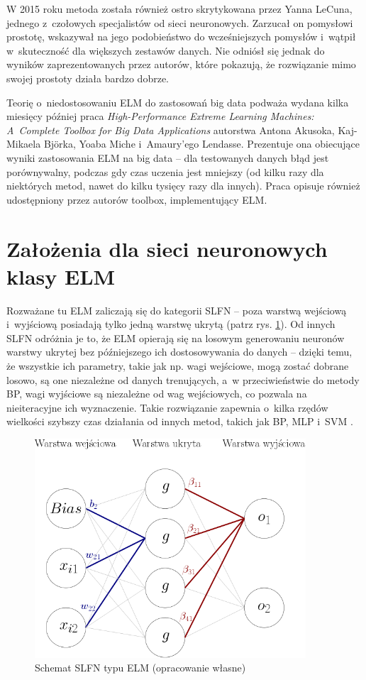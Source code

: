 \documentclass[pl]{minipw} %
\begin{document}
W 2015 roku metoda została również ostro skrytykowana przez Yanna LeCuna, jednego z~czołowych specjalistów od sieci neuronowych. Zarzucał on pomysłowi prostotę, wskazywał na jego podobieństwo do wcześniejszych pomysłów i~wątpił w~skuteczność dla większych zestawów danych. Nie odniósł się jednak do wyników zaprezentowanych przez autorów, które pokazują, że rozwiązanie mimo swojej prostoty działa bardzo dobrze.

Teorię o~niedostosowaniu ELM do zastosowań big data podważa wydana kilka miesięcy później praca \textit{High-Performance Extreme Learning Machines: A~Complete Toolbox for Big Data Applications} \cite{akusok-hpelm} autorstwa Antona Akusoka, Kaj-Mikaela Bj\"orka, Yoaba Miche i~Amaury'ego Lendasse. Prezentuje ona obiecujące wyniki zastosowania ELM na big data -- dla testowanych danych błąd jest porównywalny, podczas gdy czas uczenia jest mniejszy (od kilku razy dla niektórych metod, nawet do kilku tysięcy razy dla innych). Praca opisuje również udostępniony przez autorów toolbox, implementujący ELM.

\clearpage
\section{Założenia dla sieci neuronowych klasy ELM}
Rozważane tu ELM zaliczają się do kategorii SLFN -- poza warstwą wejściową i~wyjściową posiadają tylko jedną warstwę ukrytą (patrz rys. \ref{schemat_elm}). Od innych SLFN odróżnia je to, że ELM opierają się na losowym generowaniu neuronów warstwy ukrytej bez późniejszego ich dostosowywania do danych -- dzięki temu, że wszystkie ich parametry, takie jak np. wagi wejściowe, mogą zostać dobrane losowo, są one niezależne od danych trenujących, a~w przeciwieństwie do metody BP, wagi wyjściowe są niezależne od wag wejściowych, co pozwala na nieiteracyjne ich wyznaczenie. Takie rozwiązanie zapewnia o~kilka rzędów wielkości szybszy czas działania od innych metod, takich jak BP, MLP i~SVM \cite{akusok-hpelm}.
\label{zalozenia-sieci}
\begin{figure}[H]
\centering
\includegraphics[width=0.9\textwidth]{schemat_sieci.png}
\caption[Schemat SLFN typu ELM]{Schemat SLFN typu ELM (opracowanie własne)}
\label{schemat_elm}
\end{figure}
\end{document}
